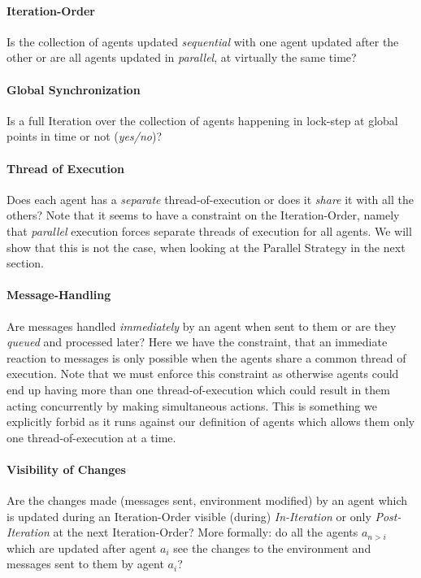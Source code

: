 \paragraph{Iteration-Order}
Is the collection of agents updated \textit{sequential} with one agent updated after the other or are all agents updated in \textit{parallel}, at virtually the same time?

\paragraph{Global Synchronization}
Is a full Iteration over the collection of agents happening in lock-step at global points in time or not (\textit{yes/no})?

\paragraph{Thread of Execution}
Does each agent has a \textit{separate} thread-of-execution or does it \textit{share} it with all the others? Note that it seems to have a constraint on the Iteration-Order, namely that \textit{parallel} execution forces separate threads of execution for all agents. We will show that this is not the case, when looking at the Parallel Strategy in the next section.

\paragraph{Message-Handling}
Are messages handled \textit{immediately} by an agent when sent to them or are they \textit{queued} and processed later? Here we have the constraint, that an immediate reaction to messages is only possible when the agents share a common thread of execution. Note that we must enforce this constraint as otherwise agents could end up having more than one thread-of-execution which could result in them acting concurrently by making simultaneous actions. This is something we explicitly forbid as it runs against our definition of agents which allows them only one thread-of-execution at a time.

\paragraph{Visibility of Changes}
Are the changes made (messages sent, environment modified) by an agent which is updated during an Iteration-Order visible (during) \textit{In-Iteration} or only \textit{Post-Iteration} at the next Iteration-Order? More formally: do all the agents $a_{n>i}$ which are updated after agent $a_i$ see the changes to the environment and messages sent to them by agent $a_i$?

